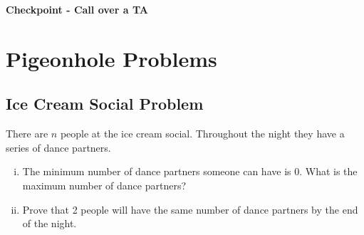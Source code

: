 \documentclass[12pt,letterpaper]{article}
\begin{document}
		\textbf{Checkpoint - Call over a TA}

		\pagebreak

		\section*{Pigeonhole Problems}
	
		\subsection*{Ice Cream Social Problem}
		There are $n$ people at the ice cream social. Throughout the night they have a series of dance partners. 

		\begin{enumerate}[i.]
			\item The minimum number of dance partners someone can have is 0. What is the maximum number of dance partners?
			
			\begin{mdframed}
			\vspace{2cm}
			\end{mdframed}

			\item Prove that 2 people will have the same number of dance partners by the end of the night.

			\begin{mdframed}
			\vspace{10cm}
			\end{mdframed}

		\end{enumerate}
\end{document}
